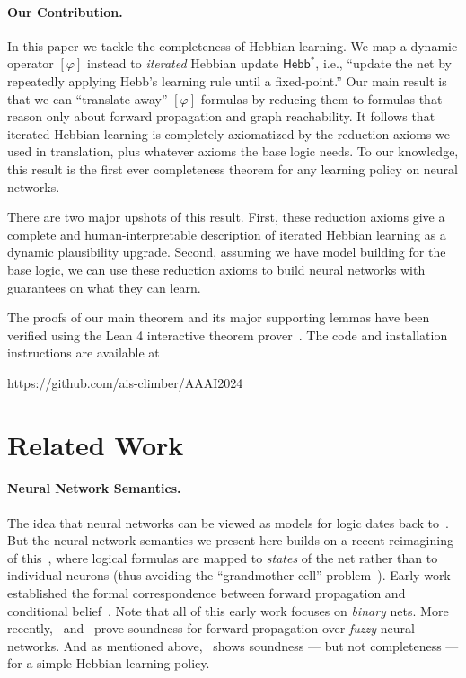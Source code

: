 \documentclass[letterpaper]{article}
\theoremstyle{definition}
\newcommand{\HebbstarNoArgs}{\mathsf{Hebb}^*}
\newcommand{\Hebbop}[1]{[#1]}
\begin{document}
\paragraph*{Our Contribution.} In this paper we tackle the completeness of Hebbian learning.  We map a dynamic operator $\Hebbop{\varphi}$ instead to \emph{iterated} Hebbian update $\HebbstarNoArgs$, i.e., ``update the net by repeatedly applying Hebb's learning rule until a fixed-point.''  Our main result is that we can ``translate away'' $\Hebbop{\varphi}$-formulas by reducing them to formulas that reason only about forward propagation and graph reachability.  It follows that iterated Hebbian learning is completely axiomatized by the reduction axioms we used in translation, plus whatever axioms the base logic needs. To our knowledge, this result is the first ever completeness theorem for any learning policy on neural networks.

There are two major upshots of this result.  First, these reduction axioms give a complete and human-interpretable description of iterated Hebbian learning as a dynamic plausibility upgrade. Second, assuming we have model building for the base logic, we can use these reduction axioms to build neural networks with guarantees on what they can learn.

The proofs of our main theorem and its major supporting lemmas have been verified using the Lean 4 interactive theorem prover~\cite{moura2021lean}.  The code and installation instructions are available at

{\centering
    https://github.com/ais-climber/AAAI2024\par
}

\section{Related Work}

\paragraph*{Neural Network Semantics.}  The idea that neural networks can be viewed as models for logic dates back to~\cite{mcculloch1943logical}.  But the neural network semantics we present here builds on a recent reimagining of this~\cite{balkenius1991nonmonotonic, leitgeb2018neural}, where logical formulas are mapped to \emph{states} of the net rather than to individual neurons (thus avoiding the ``grandmother cell'' problem~\cite{gross2002genealogy}).  Early work established the formal correspondence between forward propagation and conditional belief~\cite{balkenius1991nonmonotonic, leitgeb2001nonmonotonic, leitgeb2003nonmonotonic, blutner2004nonmonotonic}. Note that all of this early work focuses on \emph{binary} nets.  More recently,~\cite{giordano2021weighted} and~\cite{giordano2022conditional} prove soundness for forward propagation over \emph{fuzzy} neural networks.  And as mentioned above,~\cite{kisby2022logic} shows soundness --- but not completeness --- for a simple Hebbian learning policy.
\end{document}
